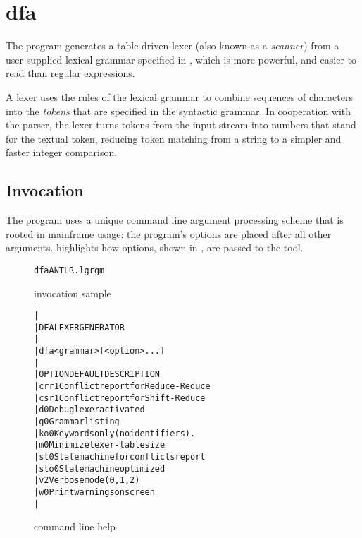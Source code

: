 \chapter{dfa}

The \dfae program generates a table-driven lexer (also known as a
\emph{scanner}) from a user-supplied lexical grammar specified in
\dfagrmfn, which is more powerful, and easier to read than regular
expressions.

A lexer uses the rules of the lexical grammar to combine sequences of
characters into the \emph{tokens} that are specified in the syntactic
grammar.  In cooperation with the parser, the lexer turns tokens from
the input stream into numbers that stand for the textual token,
reducing token matching from a string to a simpler and faster integer
comparison.

\section{Invocation}
The \dfae program uses a unique command line argument processing
scheme that is rooted in mainframe usage: the program's options are
placed after all other arguments.   highlights how
options, shown in , are passed to the tool.


\begin{figure}[h!]
  \begin{alltt}
    dfa ANTLR.lgr g m
  \end{alltt}
  \caption{\dfae invocation sample}
  \label{fig:dfa-sample}
\end{figure}


\begin{figure}
  \begin{alltt}
    |
    |   DFA LEXER GENERATOR
    |
    |   dfa <grammar> [<option>...]
    |
    |   OPTION  DEFAULT  DESCRIPTION
    |   crr         1    Conflict report for Reduce-Reduce
    |   csr         1    Conflict report for Shift-Reduce
    |   d           0    Debug lexer activated
    |   g           0    Grammar listing
    |   ko          0    Keywords only (no identifiers).
    |   m           0    Minimize lexer-table size
    |   st          0    State machine for conflicts report
    |   sto         0    State machine optimized
    |   v           2    Verbose mode (0,1,2)
    |   w           0    Print warnings on screen
    |
  \end{alltt}
  \caption{\dfae command line help}
  \label{fig:dfa-options}
\end{figure}

